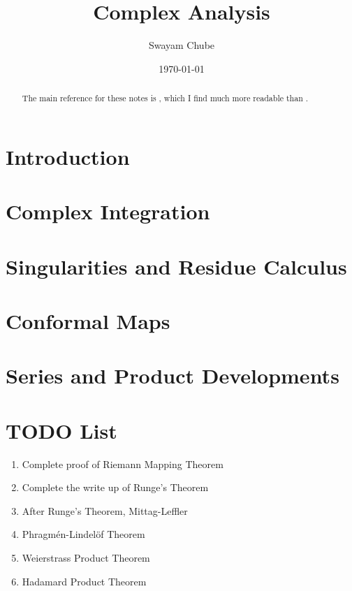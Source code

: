 \documentclass{report}
\title{Complex Analysis}
\author{Swayam Chube}
\date{\today}
\begin{document}
\maketitle 

\begin{abstract}
    The main reference for these notes is \cite{conway}, which I find much more readable than \cite{ahlfors}.
\end{abstract}

\tableofcontents

\chapter{Introduction}


\chapter{Complex Integration}


\chapter{Singularities and Residue Calculus}


\chapter{Conformal Maps}


\chapter{Series and Product Developments}


\chapter*{TODO List}
\begin{enumerate}
    \item Complete proof of Riemann Mapping Theorem
    \item Complete the write up of Runge's Theorem
    \item After Runge's Theorem, Mittag-Leffler
    \item Phragm\'en-Lindel\"of Theorem 
    \item Weierstrass Product Theorem
    \item Hadamard Product Theorem 
\end{enumerate}



\end{document}
